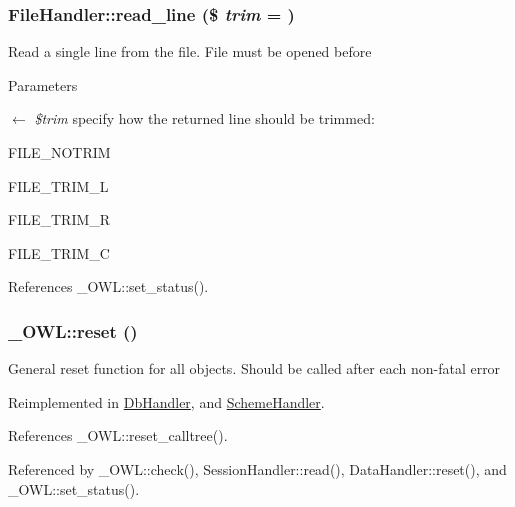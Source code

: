\subsubsection[{read\_\-line}]{\setlength{\rightskip}{0pt plus 5cm}FileHandler::read\_\-line (\$ {\em trim} = {})}\label{classFileHandler_a69f84a8138f717c84f560125f1f95448}
Read a single line from the file. File must be opened before


\begin{DoxyParams}{Parameters}
\item[\mbox{$\leftarrow$} {\em \$trim}]specify how the returned line should be trimmed:
\begin{DoxyItemize}
\item FILE\_\-NOTRIM
\item FILE\_\-TRIM\_\-L
\item FILE\_\-TRIM\_\-R
\item FILE\_\-TRIM\_\-C 
\end{DoxyItemize}\end{DoxyParams}


References \_\-OWL::set\_\-status().

\subsubsection[{reset}]{\setlength{\rightskip}{0pt plus 5cm}\_\-OWL::reset ()}\label{class__OWL_a2f2a042bcf31965194c03033df0edc9b}
General reset function for all objects. Should be called after each non-\/fatal error 

Reimplemented in \hyperlink{classDbHandler_a9982df4830f05803935bb31bac7fae3d}{DbHandler}, and \hyperlink{classSchemeHandler_aa25feb4a70d67b3d571904be4b2f50bc}{SchemeHandler}.



References \_\-OWL::reset\_\-calltree().



Referenced by \_\-OWL::check(), SessionHandler::read(), DataHandler::reset(), and \_\-OWL::set\_\-status().

